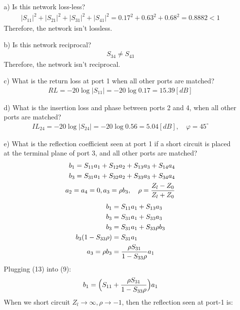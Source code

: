\documentclass[12pt, letterpaper]{article}
\begin{document}
\begin{itemize}
  \item [a)] Is this network loss-less?
  \begin{align}
    |S_{11}|^2+|S_{21}|^2+|S_{31}|^2+|S_{41}|^2=0.17^2+0.63^2+0.68^2=0.8882<1
  \end{align}
  {\color{blue}Therefore, the network isn't lossless.}
  \item [b)] Is this network reciprocal?
  \begin{align}
    S_{34}\neq S_{43}
  \end{align}
  {\color{blue}Therefore, the network isn't reciprocal.}
  \item [c)] What is the return loss at port 1 when all other ports are matched?
  \begin{align}
    RL=-20\log|S_{11}|=-20\log0.17=15.39[dB]
  \end{align}
  \item [d)] What is the insertion loss and phase between ports 2 and 4, when all other
  ports are matched?
  \begin{align}
    IL_{24}=-20\log|S_{24}|=-20\log0.56=5.04[dB], \quad \varphi=45^{\circ}
  \end{align}
  \item [e)] What is the reflection coefficient seen at port 1 if a short circuit is placed at the terminal plane of port 3, and all other ports are matched?
  \begin{align}
    b_1=S_{11}a_1+S_{12}a_2+S_{13}a_3+S_{14}a_4\\
    b_3=S_{31}a_1+S_{32}a_2+S_{33}a_3+S_{34}a_4\\
    a_2=a_4=0, a_3=\rho b_3, \quad \rho={Z_l-Z_0\over Z_l+Z_0}
  \end{align}
  \begin{align}
    b_1&=S_{11}a_1+S_{13}a_3\\
    b_3&=S_{31}a_1+S_{33}a_3\\
    b_3&=S_{31}a_1+S_{33}\rho b_3\\
    b_3(1-S_{33}\rho)&=S_{31}a_1\\
    a_3=\rho b_3&={\rho S_{31}\over1-S_{33}\rho}a_1
  \end{align}
  {\color{blue} Plugging (13) into (9):}
  \begin{align}
    b_1&=\Big(S_{11}+{\rho S_{31}\over1-S_{33}\rho}\Big)a_1\\
  \end{align}
  {\color{blue}When we short circuit $Z_l\rightarrow\infty, \rho\rightarrow-1$, then the reflection seen at port-1 is:}

\end{itemize}
\end{document}
